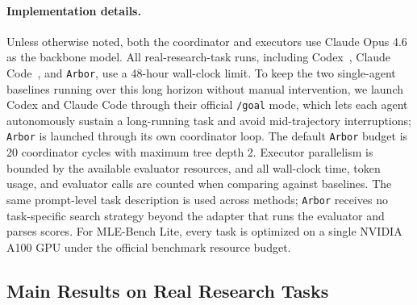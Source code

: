 \documentclass[]{selfevolagent}
\theoremstyle{plain}
\theoremstyle{definition}
\theoremstyle{remark}
\newcommand{\arbor}{\texttt{Arbor}}
\begin{document}
\paragraph{Implementation details.}
Unless otherwise noted, both the coordinator and executors use
Claude Opus 4.6 as the backbone model. All real-research-task runs, including
Codex~\citep{codex}, Claude Code~\citep{claudecode}, and \arbor{}, use a 48-hour wall-clock limit. To keep the
two single-agent baselines running over this long horizon without manual
intervention, we launch Codex and Claude Code through their official
\texttt{/goal} mode, which lets each agent autonomously sustain a long-running
task and avoid mid-trajectory interruptions; \arbor{} is launched through its
own coordinator loop. The default \arbor{} budget is 20 coordinator cycles
with maximum tree depth 2. Executor parallelism is bounded by the available
evaluator resources, and all wall-clock time, token usage, and evaluator calls
are counted when comparing against baselines. The same prompt-level task
description is used across methods; \arbor{} receives no task-specific search
strategy beyond the adapter that runs the evaluator and parses scores. For
MLE-Bench Lite, every task is optimized on a single NVIDIA A100 GPU under the
official benchmark resource budget.

\subsection{Main Results on Real Research Tasks}
\label{sec:exp-main}
\end{document}
